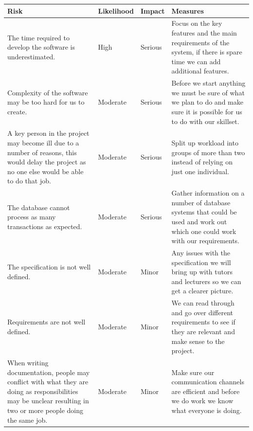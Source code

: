 \documentclass[11pt]{report}
\begin{document}
\begin{longtable}{| p{5cm} | p{2.5cm} | p{2cm} |  p{5.5cm} |}
\hline
\textbf{Risk} & \textbf{Likelihood} & \textbf{Impact} & \textbf{Measures} \\
\hline
\endfirsthead

\endlastfoot

\multicolumn{2}{c}{\textit{Continued from last page}}
\endhead

\multicolumn{2}{c}{\textit{Continued on next page}}
\endfoot

The time required to develop the software is underestimated. & 
High & 
Serious & 
Focus on the key features and the main requirements of the system, if there is spare time we can add additional features. \\ 
\hline
Complexity of the software may be too hard for us to create.&
Moderate&
Serious&
Before we start anything we must be sure of what we plan to do and make sure it is possible for us to do with our skillset.\\
\hline

A key person in the project may become ill due to a number of reasons, this would delay the project as no one else would be able to do that job.&
Moderate&
Serious&
Split up workload into groups of more than two instead of relying on just one individual.\\
\hline


The database cannot process as many transactions as expected.& 
Moderate&
Serious&
Gather information on a number of database systems that could be used and work out which one could work with our requirements.\\
\hline

The specification is not well defined.& 
Moderate&
Minor&
Any issues with the specification we will bring up with tutors and lecturers so we can get a clearer picture.\\
\hline


Requirements are not well defined.& 
Moderate&
Minor&
We can read through and go over different requirements to see  if they are relevant and make sense to the project.\\
\hline

When writing documentation, people may conflict with what they are doing as responsibilities may be unclear resulting in two or more people doing the same job.& 
Moderate&
Minor&
Make sure our communication channels are efficient and before we do work we know what everyone is doing.\\
\hline


\end{longtable}
\end{document}
